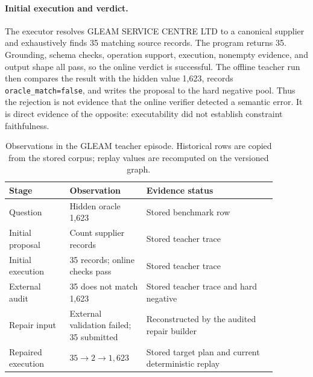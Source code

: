 \documentclass{article}
\begin{document}
\paragraph{Initial execution and verdict.}
The executor resolves GLEAM SERVICE CENTRE LTD to a canonical supplier and exhaustively finds 35
matching source records.  The program returns 35.  Grounding, schema checks, operation support,
execution, nonempty evidence, and output shape all pass, so the online verdict is successful.  The
offline teacher run then compares the result with the hidden value 1,623, records
\texttt{oracle\_match=false}, and writes the proposal to the hard negative pool.  Thus the rejection
is not evidence that the online verifier detected a semantic error.  It is direct evidence of the
opposite: executability did not establish constraint faithfulness.

\begin{table}[h]
  \centering
  \caption{Observations in the GLEAM teacher episode.  Historical rows are copied from the stored
  corpus; replay values are recomputed on the versioned graph.}
  \label{tab:gleam-episode}
  \small
  \begin{tabular}{p{0.20\linewidth}p{0.25\linewidth}p{0.43\linewidth}}
    \toprule
    Stage & Observation & Evidence status \\
    \midrule
    Question & Hidden oracle 1,623 & Stored benchmark row \\
    Initial proposal & Count supplier records & Stored teacher trace \\
    Initial execution & 35 records; online checks pass & Stored teacher trace \\
    External audit & 35 does not match 1,623 & Stored teacher trace and hard negative \\
    Repair input & External validation failed; 35 submitted & Reconstructed by the audited repair builder \\
    Repaired execution & $35\rightarrow2\rightarrow1{,}623$ & Stored target plan and current deterministic replay \\
    \bottomrule
  \end{tabular}
\end{table}
\end{document}
